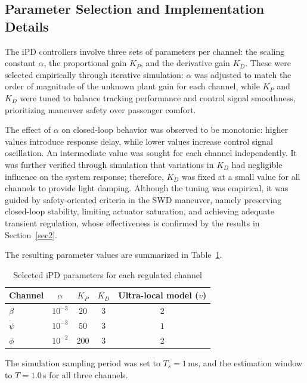 \documentclass[sn-chicago,iicol]{sn-jnl}
\theoremstyle{thmstyleone}%
\theoremstyle{thmstyletwo}%
\theoremstyle{thmstylethree}%
\begin{document}
\subsection{Parameter Selection and Implementation 
            Details}\label{sec:params}

The iPD controllers involve three sets of parameters per channel: the 
scaling constant $\alpha$, the proportional gain $K_P$, and the derivative 
gain $K_D$. These were selected empirically through iterative simulation: 
$\alpha$ was adjusted to match the order of magnitude of the unknown plant 
gain for each channel, while $K_P$ and $K_D$ were tuned to balance 
tracking performance and control signal smoothness, prioritizing maneuver 
safety over passenger comfort.

The effect of $\alpha$ on closed-loop behavior was observed to be 
monotonic: higher values introduce response delay, while lower values 
increase control signal oscillation. An intermediate value was sought 
for each channel independently. It was further verified through 
simulation that variations in $K_D$ had negligible influence on the 
system response; therefore, $K_D$ was fixed at a small value for all 
channels to provide light damping. Although the tuning was empirical, it 
was guided by safety-oriented criteria in the SWD maneuver, namely 
preserving closed-loop stability, limiting actuator saturation, and 
achieving adequate transient regulation, whose effectiveness is confirmed 
by the results in Section~\ref{sec2}.

The resulting parameter values are summarized in 
Table~\ref{tab:params}.

\begin{table}[h]
\centering
\caption{Selected iPD parameters for each regulated channel}
\label{tab:params}
\begin{tabular}{lcccc}
\toprule
Channel & $\alpha$ & $K_P$ & $K_D$ & Ultra-local model ($v$) \\
\midrule
$\beta$ & $10^{-3}$   & $20$  & $3$ & $2$ \\
$\dot{\psi}$ & $10^{-3}$ & $50$  & $3$ & $1$ \\
$\phi$ & $10^{-2}$ & $200$ & $3$ & $2$ \\
\bottomrule
\end{tabular}
\end{table}

The simulation sampling period was set to $T_s = 1$\,ms, and the 
estimation window to $T = 1.0$\,s for all three channels.
\end{document}
